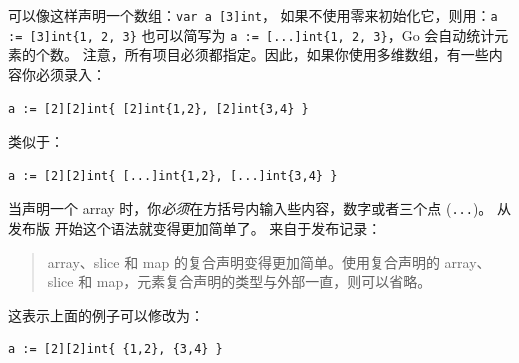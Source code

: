 可以像这样声明一个数组：\lstinline{var a [3]int}，
如果不使用零来初始化它，则用：\lstinline|a := [3]int{1, 2, 3}| 也可以简写为
\lstinline|a := [...]int{1, 2, 3}|，Go 会自动统计元素的个数。
注意，所有项目必须都指定。因此，如果你使用多维数组，有一些内容你必须录入：
\begin{lstlisting}
a := [2][2]int{ [2]int{1,2}, [2]int{3,4} }
\end{lstlisting}
类似于：
\begin{lstlisting}
a := [2][2]int{ [...]int{1,2}, [...]int{3,4} }
\end{lstlisting}
当声明一个 array 时，你\emph{必须}在方括号内输入些内容，数字或者三个点
(\verb|...|)。%
从发布版 \cite{go_release_hist} 开始这个语法就变得更加简单了。
来自于发布记录：
\begin{quote}
array、slice 和 map 的复合声明变得更加简单。使用复合声明的
array、slice 和 map，元素复合声明的类型与外部一直，则可以省略。
\end{quote}
这表示上面的例子可以修改为：
\begin{lstlisting}
a := [2][2]int{ {1,2}, {3,4} }
\end{lstlisting}

